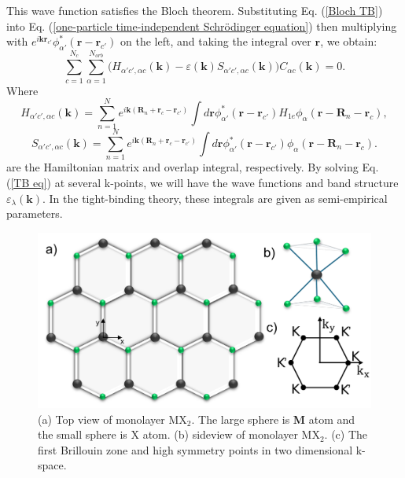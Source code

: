 \documentclass[12pt,english,a4paper]{article}
\begin{document}
\quad This wave function satisfies the Bloch theorem. Substituting Eq. (\ref{Bloch TB}) into Eq. (\ref{one-particle time-independent Schrödinger equation}) then multiplying with $e^{i\textbf{k}\textbf{r}_{c'}} \phi_{\alpha'}^* (\textbf{r}-\textbf{r}_{c'})$ on the left, and taking the integral over $\textbf{r}$, we obtain:
	\begin{equation}
		\label{TB eq}
	\sum_{c=1}^{N_c} \sum_{\alpha = 1}^{N_{orb}}\big(H_{\alpha'c',\alpha c}(\textbf{k}) - \varepsilon(\textbf{k})S_{\alpha'c',\alpha c}(\textbf{k})\big) C_{\alpha c}(\textbf{k}) =0.
	\end{equation}
\quad Where
	\begin{equation}
		H_{\alpha'c',\alpha c}(\textbf{k}) = \sum_{n=1}^N e^{i\textbf{k}(\textbf{R}_n +\textbf{r}_c -\textbf{r}_{c'})} \int d\textbf{r} \phi^*_{\alpha'}(\textbf{r}-\textbf{r}_{c'}) H_{1e} \phi_{\alpha}(\textbf{r}-\textbf{R}_n -\textbf{r}_c),
		\label{hopping energies}
	\end{equation}
	\begin{equation}
		S_{\alpha'c',\alpha c}(\textbf{k}) = \sum_{n=1}^N e^{i\textbf{k}(\textbf{R}_n +\textbf{r}_c -\textbf{r}_{c'})} \int d\textbf{r} \phi^*_{\alpha'}(\textbf{r}-\textbf{r}_{c'}) \phi_{\alpha}(\textbf{r}-\textbf{R}_n -\textbf{r}_c).
	\end{equation}
\quad are the Hamiltonian matrix and overlap integral, respectively. By solving Eq. (\ref{TB eq}) at several k-points, we will have the wave functions and band structure $\varepsilon_\lambda(\textbf{k})$. In the tight-binding theory, these integrals are given as semi-empirical parameters.
	\begin{figure}
		\begin{center}
			\includegraphics[width=0.75\linewidth]{Images/RS.pdf}
			\caption[TMD structure and its first Brillouin zone]{(a) Top view of monolayer $\mathrm{MX}_2$. The large sphere is \textbf{M} atom and the small sphere is X atom. (b) sideview of monolayer $\mathrm{MX}_2$. (c) The first Brillouin zone and high symmetry points in two dimensional k-space.}
			\label{real space}
		\end{center}
	\end{figure}
\end{document}
